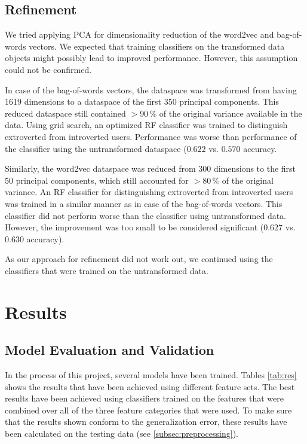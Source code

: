 \documentclass[12pt]{elsarticle}
\begin{document}
\subsection{Refinement}
We tried applying PCA for dimensionality reduction of the word2vec and bag-of-words vectors. We expected that training classifiers on the transformed data objects might possibly lead to improved performance. However, this assumption could not be confirmed.


In case of the bag-of-words vectors, the dataspace was transformed from having 1619 dimensions to a dataspace of the first 350 principal components. This reduced dataspace still contained $> 90\,\%$ of the original variance available in the data. Using grid search, an optimized RF classifier was trained to distinguish extroverted from introverted users. Performance was worse than performance of the classifier using the untransformed dataspace ($0.622$ vs. $0.570$ accuracy. 


Similarly, the word2vec dataspace was reduced from 300 dimensions to the first 50 principal components, which still accounted for $> 80\,\%$ of the original variance. An RF classifier for distinguishing extroverted from introverted users was trained in a similar manner as in case of the bag-of-words vectors. This classifier did not perform worse than the classifier using untransformed data. However, the improvement was too small to be considered significant ($0.627$ vs. $0.630$ accuracy).


As our approach for refinement did not work out, we continued using the classifiers that were trained on the untransformed data.



\section{Results}
\subsection{Model Evaluation and Validation}
In the process of this project, several models have been trained. Tables \ref{tab:res} shows the results that have been achieved using different feature sets. The best results have been achieved using classifiers trained on the features that were combined over all of the three feature categories that were used. To make sure that the results shown conform to the generalization error, these results have been calculated on the testing data (see \ref{subsec:preprocessing}).
\end{document}

